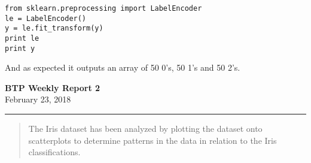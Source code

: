 \documentclass[11pt,letterpaper]{article}
\begin{document}
\begin{lstlisting}
from sklearn.preprocessing import LabelEncoder
le = LabelEncoder()
y = le.fit_transform(y)
print le
print y
\end{lstlisting}

\noindent
And as expected it outputs an array of 50 0's, 50 1's and 50 2's.








\bigskip
\bigskip

\bigskip
\bigskip
\bigskip
\bigskip
\bigskip
\bigskip

\bigskip
\bigskip
\bigskip

\begin{center}\vspace{-1cm}
\textbf{ \large BTP Weekly Report 2}\\
February 23, 2018
\end{center}

\rule{\linewidth}{0.1mm}
\bigskip


\begin{abstract}
The Iris dataset has been analyzed by plotting the dataset onto
scatterplots to determine patterns in the data in
relation to the Iris classifications. 
\end{abstract}
\end{document}
